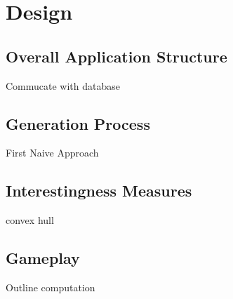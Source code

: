 \chapter{Design}\label{chapter:design}

\section{Overall Application Structure}

Commucate with database

\section{Generation Process}

First Naive Approach

\section{Interestingness Measures}
convex hull

\section{Gameplay}
Outline computation
